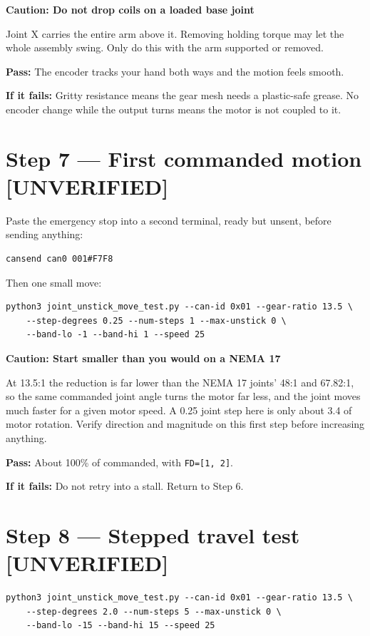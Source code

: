 \documentclass[11pt,letterpaper]{article}
\newenvironment{caution}[1]{%
    \par\addvspace{8pt}%
    \noindent{\color{cautionred}\rule{\linewidth}{0.8pt}}\par\vspace{2pt}
    \noindent\textbf{\color{cautionred}Caution: #1}\par\vspace{2pt}
}{%
    \par\vspace{2pt}\noindent{\color{cautionred}\rule{\linewidth}{0.4pt}}%
    \par\addvspace{8pt}%
}
\newcommand{\unverified}{{\color{unverifiedorange}\textbf{[UNVERIFIED]}}}
\newcommand{\passif}[1]{\par\vspace{2pt}\noindent\textbf{\color{okgreen}Pass:} #1\par\vspace{4pt}}
\newcommand{\failif}[1]{\noindent\textbf{If it fails:} #1\par\vspace{6pt}}
\begin{document}
\begin{caution}{Do not drop coils on a loaded base joint}
Joint X carries the entire arm above it. Removing holding torque may let the whole
assembly swing. Only do this with the arm supported or removed.
\end{caution}

\passif{The encoder tracks your hand both ways and the motion feels smooth.}
\failif{Gritty resistance means the gear mesh needs a plastic-safe grease. No encoder
change while the output turns means the motor is not coupled to it.}

\section*{Step 7 --- First commanded motion \unverified}

Paste the emergency stop into a second terminal, ready but unsent, before sending
anything:

\begin{lstlisting}
cansend can0 001#F7F8
\end{lstlisting}

Then one small move:

\begin{lstlisting}
python3 joint_unstick_move_test.py --can-id 0x01 --gear-ratio 13.5 \
    --step-degrees 0.25 --num-steps 1 --max-unstick 0 \
    --band-lo -1 --band-hi 1 --speed 25
\end{lstlisting}

\begin{caution}{Start smaller than you would on a NEMA 17}
At 13.5:1 the reduction is far lower than the NEMA 17 joints' 48:1 and 67.82:1, so
the same commanded joint angle turns the motor far less, and the joint moves much
faster for a given motor speed. A 0.25\textdegree{} joint step here is only about
3.4\textdegree{} of motor rotation. Verify direction and magnitude on this first
step before increasing anything.
\end{caution}

\passif{About 100\% of commanded, with \texttt{FD=[1, 2]}.}
\failif{Do not retry into a stall. Return to Step 6.}

\section*{Step 8 --- Stepped travel test \unverified}

\begin{lstlisting}
python3 joint_unstick_move_test.py --can-id 0x01 --gear-ratio 13.5 \
    --step-degrees 2.0 --num-steps 5 --max-unstick 0 \
    --band-lo -15 --band-hi 15 --speed 25
\end{lstlisting}
\end{document}

